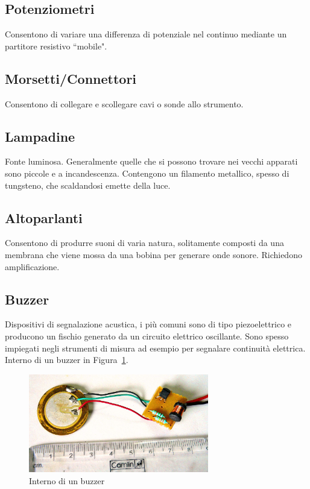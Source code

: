 \documentclass[12pt,a4paper]{report}
\begin{document}
\subsection{Potenziometri}
Consentono di variare una differenza di potenziale nel continuo mediante un partitore resistivo ``mobile".
\subsection{Morsetti/Connettori}
Consentono di collegare e scollegare cavi o sonde allo strumento.
\subsection{Lampadine}
Fonte luminosa. Generalmente quelle che si possono trovare nei vecchi apparati sono piccole e a incandescenza. Contengono un filamento
metallico, spesso di tungsteno, che scaldandosi emette della luce.
\subsection{Altoparlanti}
Consentono di produrre suoni di varia natura, solitamente composti da una membrana che viene mossa da una bobina per generare onde
sonore. Richiedono amplificazione.
\subsection{Buzzer}
Dispositivi di segnalazione acustica, i più comuni sono di tipo piezoelettrico e producono un fischio generato da un circuito elettrico oscillante.
Sono spesso impiegati negli strumenti di misura ad esempio per segnalare continuità elettrica.
Interno di un buzzer in Figura~\ref{fig:internobuzzer}.

\begin{figure}[h]
  \centering
  \includegraphics[width=0.7\textwidth]{internobuzzer}
  \caption{Interno di un buzzer \cite{wiki:internobuzzer}}
  \label{fig:internobuzzer}
\end{figure}
\end{document}
